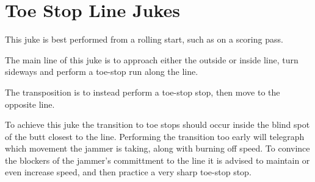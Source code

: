 \section{Toe Stop Line Jukes}

This juke is best performed from a rolling start, such as on a scoring pass. 


The main line of this juke is to approach either the outside or inside line, turn sideways and perform a toe-stop run along the line.   

The transposition is to instead perform a toe-stop stop, then move to the opposite line.  


To achieve this juke the transition to toe stops should occur inside the blind spot of the butt closest to the line.  
Performing the transition too early will telegraph which movement the jammer is taking, along with burning off speed. 
To convince the blockers of the jammer's committment to the line it is advised to maintain or even increase speed, and then practice a very sharp toe-stop stop.     
